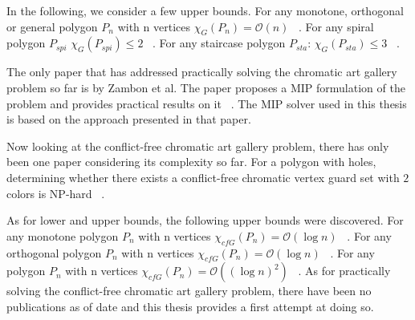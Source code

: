 In the following, we consider a few upper bounds.
For any monotone, orthogonal or general polygon $P_n$ with n vertices $\chi_G(P_n) = \mathcal{O}(n)$ ~\cite{bartschi2011coloring}.
For any spiral polygon $P_{spi}$ $\chi_G(P_{spi}) \leq 2$ ~\cite{erickson2012art}.
For any staircase polygon $P_{sta}$: $\chi_G(P_{sta}) \leq 3$ ~\cite{erickson2012art}.\par\noindent
The only paper that has addressed practically solving the chromatic art gallery problem so far is by Zambon et al. The paper proposes a MIP formulation of the problem and provides practical results on it ~\cite{zambon2014exact}. The MIP solver used in this thesis is based on the approach presented in that paper.\par\noindent
Now looking at the conflict-free chromatic art gallery problem, there has only been one paper considering its complexity so far.
For a polygon with holes, determining whether there exists a conflict-free chromatic vertex guard set with $2$ colors is NP-hard ~\cite{iwamoto2022vertex}.\par\noindent
As for lower and upper bounds, the following upper bounds were discovered.
For any monotone polygon $P_n$ with n vertices $\chi_{cfG}(P_n) = \mathcal{O}(\log n)$ ~\cite{bartschi2011coloring}.
For any orthogonal polygon $P_n$ with n vertices $\chi_{cfG}(P_n) = \mathcal{O}(\log n)$ ~\cite{bartschi2011coloring}.
For any polygon $P_n$ with n vertices $\chi_{cfG}(P_n) = \mathcal{O}((\log n)^2)$ ~\cite{bartschi2011coloring}.
As for practically solving the conflict-free chromatic art gallery problem, there have been no publications as of date and this thesis provides a first attempt at doing so.


